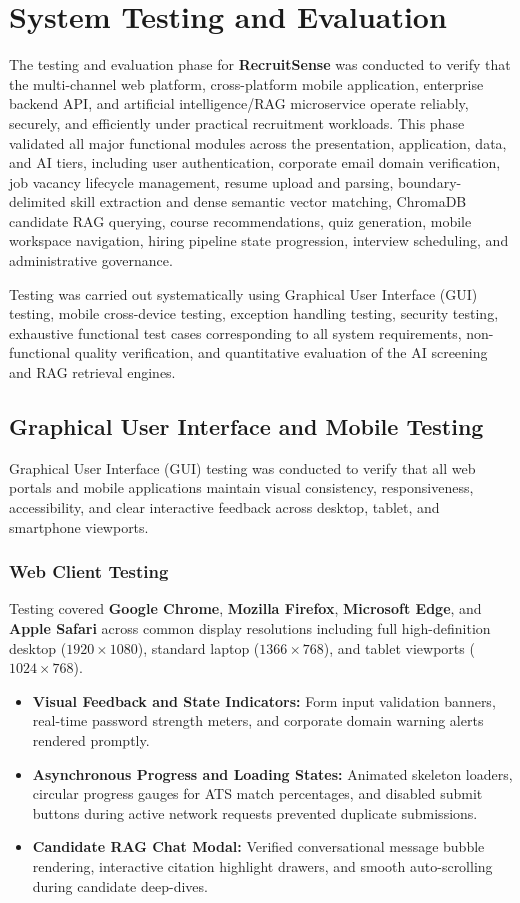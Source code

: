 \chapter{System Testing and Evaluation}\label{chap:testingEvaluation}

The testing and evaluation phase for \textbf{RecruitSense} was conducted to verify that the multi-channel web platform, cross-platform mobile application, enterprise backend API, and artificial intelligence/RAG microservice operate reliably, securely, and efficiently under practical recruitment workloads. This phase validated all major functional modules across the presentation, application, data, and AI tiers, including user authentication, corporate email domain verification, job vacancy lifecycle management, resume upload and parsing, boundary-delimited skill extraction and dense semantic vector matching, ChromaDB candidate RAG querying, course recommendations, quiz generation, mobile workspace navigation, hiring pipeline state progression, interview scheduling, and administrative governance.

Testing was carried out systematically using Graphical User Interface (GUI) testing, mobile cross-device testing, exception handling testing, security testing, exhaustive functional test cases corresponding to all system requirements, non-functional quality verification, and quantitative evaluation of the AI screening and RAG retrieval engines.

\section{Graphical User Interface and Mobile Testing}
Graphical User Interface (GUI) testing was conducted to verify that all web portals and mobile applications maintain visual consistency, responsiveness, accessibility, and clear interactive feedback across desktop, tablet, and smartphone viewports.

\subsection{Web Client Testing}
Testing covered \textbf{Google Chrome}, \textbf{Mozilla Firefox}, \textbf{Microsoft Edge}, and \textbf{Apple Safari} across common display resolutions including full high-definition desktop ($1920\times1080$), standard laptop ($1366\times768$), and tablet viewports ($1024\times768$).
\begin{itemize}
    \item \textbf{Visual Feedback and State Indicators:} Form input validation banners, real-time password strength meters, and corporate domain warning alerts rendered promptly.
    \item \textbf{Asynchronous Progress and Loading States:} Animated skeleton loaders, circular progress gauges for ATS match percentages, and disabled submit buttons during active network requests prevented duplicate submissions.
    \item \textbf{Candidate RAG Chat Modal:} Verified conversational message bubble rendering, interactive citation highlight drawers, and smooth auto-scrolling during candidate deep-dives.
\end{itemize}

